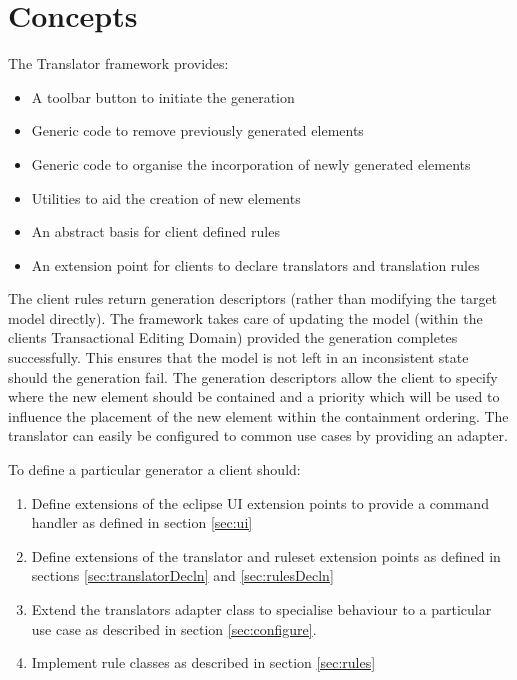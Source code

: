 \section{Concepts}
\label{sec:concepts}

The Translator framework provides:

\begin{itemize}
	\item A toolbar button to initiate the generation
	\item Generic code to remove previously generated elements
	\item Generic code to organise the incorporation of newly generated elements
	\item Utilities to aid the creation of new elements
	\item An abstract basis for client defined rules
	\item An extension point for clients to declare translators and translation rules
\end{itemize}

The client rules return generation descriptors (rather than modifying the target model directly). 
The framework takes care of updating the model (within the clients Transactional Editing Domain) provided the generation completes successfully. 
This ensures that the model is not left in an inconsistent state should the generation fail. 
The generation descriptors allow the client to specify where the new element should be contained and a priority which will be used to influence the placement of the new element within the containment ordering.
The translator can easily be configured to common use cases by providing an adapter.

To define a particular generator a client should:
\begin{enumerate}
	\item Define extensions of the eclipse UI extension points to provide a command handler as defined in section \ref{sec:ui}
	\item Define extensions of the translator and ruleset extension points as defined in sections \ref{sec:translatorDecln} and \ref{sec:rulesDecln} 
	\item Extend the translators adapter class to specialise behaviour to a particular use case as described in section \ref{sec:configure}.
	\item Implement rule classes as described in section \ref{sec:rules}
\end{enumerate}

